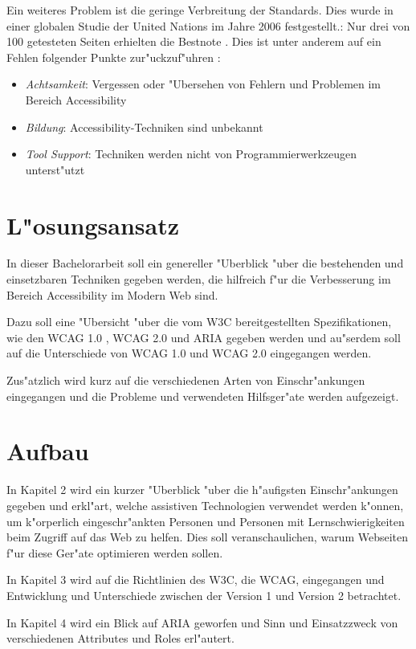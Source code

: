 \documentclass[a4paper,bibtotoc,oneside]{scrbook}
\begin{document}
Ein weiteres Problem ist die geringe Verbreitung der Standards. Dies wurde in einer globalen Studie der United Nations im Jahre 2006 festgestellt.\cite{acc_report}: Nur drei von 100 getesteten Seiten erhielten die Bestnote \cite [S. 7]{acc_report}. Dies ist unter anderem auf ein Fehlen folgender Punkte zur"uckzuf"uhren \cite[S. 13]{tool_acc}: 

\begin{itemize}
\item \emph{Achtsamkeit}: Vergessen oder "Ubersehen von Fehlern und Problemen im Bereich Accessibility
\item \emph{Bildung}: Accessibility-Techniken sind unbekannt
\item \emph{Tool Support}: Techniken werden nicht von Programmierwerkzeugen unterst"utzt
\end{itemize}


\section{L"osungsansatz}
In dieser Bachelorarbeit soll ein genereller "Uberblick "uber die bestehenden und einsetzbaren Techniken gegeben werden, die hilfreich f"ur die Verbesserung im Bereich Accessibility im Modern Web sind. 

Dazu soll eine "Ubersicht "uber die vom W3C bereitgestellten Spezifikationen, wie den WCAG 1.0 \cite{wcag1}, WCAG 2.0 \cite{wcag2} und ARIA \cite{aria} gegeben werden und au"serdem soll auf die Unterschiede von WCAG 1.0 und WCAG 2.0 eingegangen werden.

Zus"atzlich wird kurz auf die verschiedenen Arten von Einschr"ankungen eingegangen und die Probleme und verwendeten Hilfsger"ate werden aufgezeigt.

\section{Aufbau}
In Kapitel 2 wird ein kurzer "Uberblick "uber die h"aufigsten Einschr"ankungen gegeben und erkl"art, welche assistiven Technologien verwendet werden k"onnen, um k"orperlich eingeschr"ankten Personen und Personen mit Lernschwierigkeiten beim Zugriff auf das Web zu helfen. Dies soll veranschaulichen, warum  Webseiten f"ur diese Ger"ate optimieren werden sollen.

In Kapitel 3 wird auf die Richtlinien des W3C, die WCAG, eingegangen und Entwicklung und Unterschiede zwischen der Version 1 und Version 2 betrachtet.

In Kapitel 4 wird ein Blick auf ARIA geworfen und Sinn und Einsatzzweck von verschiedenen Attributes und Roles erl"autert.
\end{document}
